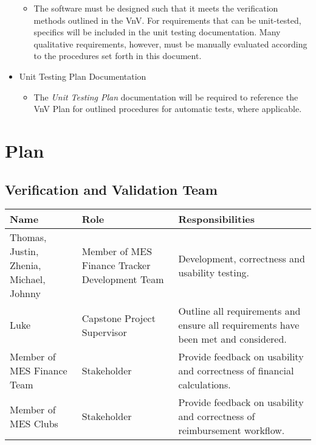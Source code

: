 \documentclass[12pt, titlepage]{article}
\begin{document}
\begin{itemize}
    \begin{itemize}
      \item The software must be designed such that it meets the verification methods outlined in the VnV. For requirements that can be
      unit-tested, specifics will be included in the unit testing documentation. Many qualitative requirements, however, must be manually
      evaluated according to the procedures set forth in this document.
    \end{itemize}
  \item Unit Testing Plan Documentation
    \begin{itemize}
      \item The \textit{Unit Testing Plan} documentation will be required to reference the VnV Plan for outlined procedures for automatic
      tests, where applicable.
    \end{itemize}
\end{itemize}



\section{Plan}


\subsection{Verification and Validation Team}

\noindent
\begin{tabularx}{\textwidth}{>{\raggedright\arraybackslash}p{3.5cm} >{\raggedright\arraybackslash}p{3.5cm} X}
\toprule
\textbf{Name} & \textbf{Role} & \textbf{Responsibilities}\\
\midrule
Thomas, Justin, Zhenia, Michael, Johnny & Member of MES Finance Tracker Development Team & Development, correctness and usability testing.\\
Luke & Capstone Project Supervisor & Outline all requirements and ensure all requirements have been met and considered.\\
Member of MES Finance Team & Stakeholder & Provide feedback on usability and correctness of financial calculations.\\
Member of MES Clubs & Stakeholder & Provide feedback on usability and correctness of reimbursement workflow.\\
\bottomrule
\end{tabularx}
\end{document}
